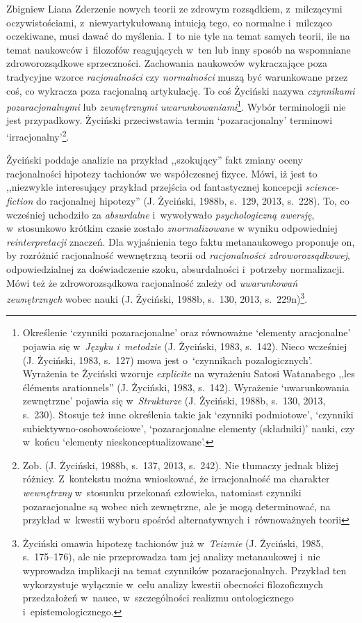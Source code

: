 \begin{artplenv}{Zbigniew Liana}
Zderzenie nowych teorii ze zdrowym rozsądkiem, z~milczącymi oczywistościami, z~niewyartykułowaną intuicją tego, co
normalne i~milcząco oczekiwane, musi dawać do myślenia. I~to nie tyle na temat samych teorii, ile na temat naukowców i~filozofów
reagujących w~ten lub inny sposób na wspomniane zdroworozsądkowe sprzeczności. Zachowania naukowców
wykraczające poza tradycyjne wzorce \textit{racjonalności} czy \textit{normalności} muszą być warunkowane przez coś, co
wykracza poza racjonalną artykulację. To coś Życiński nazywa \textit{czynnikami pozaracjonalnymi} lub \textit{zewnętrznymi
uwarunkowaniami}\footnote{Określenie `czynniki pozaracjonalne' oraz równoważne `elementy aracjonalne' pojawia
się w~\textit{Języku i~metodzie} \label{ref:RNDQuqexwGAtV}(J. Życiński, 1983, s.~142). Nieco wcześniej
\label{ref:RND8JMQ2LGnoG}(J. Życiński, 1983, s.~127) mowa jest o~`czynnikach pozalogicznych'. Wyrażenia te Życiński
wzoruje \textit{explicite} na wyrażeniu Satosi Watanabego ,,les éléments arationnels'' \label{ref:RNDDibcJHr6Ng}(J.
Życiński, 1983, s.~142). Wyrażenie `uwarunkowania zewnętrzne' pojawia się w~\textit{Strukturze}
\label{ref:RNDmQCXMWkgmK}(J. Życiński, 1988b, s.~130, 2013, s.~230). Stosuje też inne określenia takie jak `czynniki
podmiotowe', `czynniki subiektywno-osobowościowe', `pozaracjonalne elementy\textit{ }(składniki)' nauki, czy w~końcu
`elementy nieskonceptualizowane'.}. Wybór terminologii nie jest przypadkowy. Życiński przeciwstawia termin
`pozaracjonalny' terminowi `irracjonalny'\footnote{Zob. \label{ref:RND4GDp5Hkb8p}(J. Życiński, 1988b, s.~137, 2013,
s.~242). Nie tłumaczy jednak bliżej różnicy. Z~kontekstu można wnioskować, że irracjonalność ma charakter
\textit{wewnętrzny} w~stosunku przekonań człowieka, natomiast czynniki pozaracjonalne są wobec nich zewnętrzne, ale je mogą determinować,
na przykład w~kwestii wyboru spośród alternatywnych i~równoważnych teorii}.

Życiński poddaje analizie na przykład ,,szokujący'' fakt zmiany oceny racjonalności hipotezy tachionów we współczesnej
fizyce. Mówi, iż jest to ,,niezwykle interesujący przykład przejścia od fantastycznej koncepcji \textit{science-fiction}
do racjonalnej hipotezy'' \label{ref:RNDOVbNCXy3az}(J. Życiński, 1988b, s.~129, 2013, s.~228). To, co wcześniej
uchodziło za \textit{absurdalne} i~wywoływało \textit{psychologiczną awersję}, w~stosunkowo krótkim czasie zostało
\textit{znormalizowane }w wyniku odpowiedniej \textit{reinterpretacji} znaczeń. Dla wyjaśnienia tego faktu metanaukowego
proponuje on, by rozróżnić racjonalność wewnętrzną teorii od \textit{racjonalności zdroworozsądkowej}, odpowiedzialnej za
doświadczenie szoku, absurdalności i~potrzeby normalizacji. Mówi też że zdroworozsądkowa racjonalność zależy od
\textit{uwarunkowań zewnętrznych} wobec nauki \label{ref:RNDDERgYAAw4H}(J. Życiński, 1988b, s.~130, 2013,
s.~229n)\footnote{Życiński omawia hipotezę tachionów już w~\textit{Teizmie} \label{ref:RNDGRaNeNBaa8}(J. Życiński, 1985,
s.~175–176), ale nie przeprowadza tam jej analizy metanaukowej i~nie wyprowadza implikacji na temat czynników
pozaracjonalnych. Przykład ten wykorzystuje wyłącznie w~celu analizy kwestii obecności filozoficznych
przedzałożeń w~nauce, w~szczególności realizmu ontologicznego i~epistemologicznego.}.


\end{artplenv}
